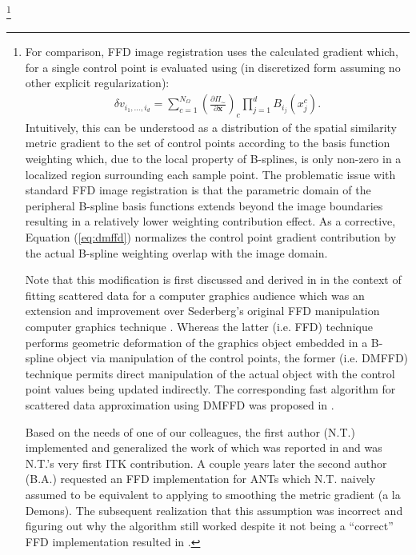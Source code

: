 \documentclass{frontiersSCNS}
\begin{document}
\footnote{
For comparison, FFD image registration uses the
calculated gradient which, for a single control point is evaluated using (in 
discretized form assuming no other explicit regularization):
\begin{align}
\label{eq:ffd}
  \delta v_{i_1,\ldots,i_d} = \sum_{c=1}^{N_{\Omega}} 
  \left( \frac{\partial \Pi_\sim}{\partial \mathbf{x}} \right)_c 
  \prod_{j=1}^d B_{i_j}(x_j^c).
\end{align}
Intuitively, this can be understood as a distribution of the spatial similarity metric
gradient to the set of control points according to the basis function weighting which, due to
the local property of B-splines, is only non-zero in a localized region surrounding each 
sample point.  The problematic issue with standard FFD image registration is that 
the parametric domain of 
the peripheral B-spline basis functions extends beyond the image boundaries resulting in
a relatively lower weighting contribution effect.  As a corrective, Equation (\ref{eq:dmffd})
normalizes the control point gradient contribution by the actual B-spline weighting overlap
with the image domain.  

Note that this modification is first discussed and derived in \cite{hsu1992,lee1997} in the context of fitting scattered data for a computer graphics audience which was an extension and improvement over Sederberg's original FFD manipulation computer graphics technique \citep{sederberg1986}.  Whereas the latter (i.e. FFD) technique performs geometric deformation of the graphics object embedded in a B-spline object via manipulation of the control points, the former (i.e. DMFFD) technique permits direct manipulation of the actual
object with the control point values being updated indirectly.  The corresponding fast algorithm for scattered data approximation using DMFFD was proposed in \cite{lee1997}.

Based on the needs of one of our colleagues, the first author (N.T.) implemented and
generalized the work of \cite{lee1997}  which was reported in \cite{tustison2006} and
was N.T.'s very first ITK contribution.  
A couple years later the second author (B.A.) requested an FFD implementation for 
ANTs which N.T. naively assumed to be equivalent to applying \cite{tustison2006}
to smoothing the metric gradient (a la Demons).  The subsequent realization 
that this assumption was incorrect and figuring out why the algorithm still worked 
despite it not being a ``correct'' FFD implementation resulted in \cite{tustison2009}.
}
\end{document}
